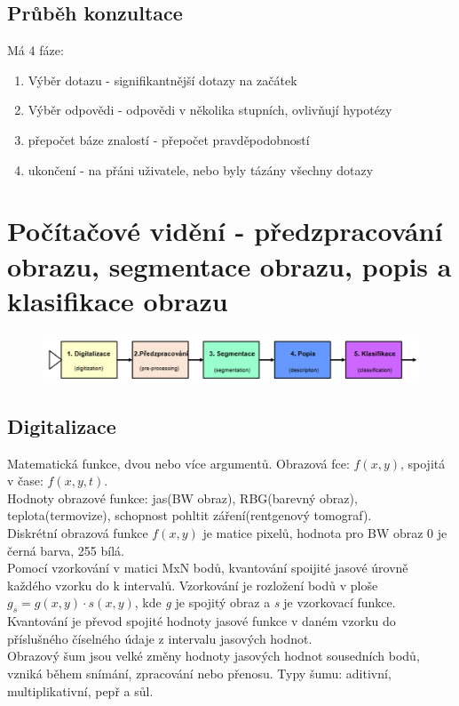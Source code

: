 \subsection{Průběh konzultace}
Má 4 fáze:
\begin{enumerate}
    \item Výběr dotazu - signifikantnější dotazy na začátek
    \item Výběr odpovědi - odpovědi v několika stupních, ovlivňují hypotézy
    \item přepočet báze znalostí - přepočet pravděpodobností
    \item ukončení - na přáni uživatele, nebo byly tázány všechny dotazy
\end{enumerate}

\section{Počítačové vidění - předzpracování obrazu, segmentace obrazu, popis a klasifikace obrazu}
\begin{figure}[H]
    \includegraphics[scale = 0.4]{images/pc_videni.png}
\end{figure}
\subsection{Digitalizace}
Matematická funkce, dvou nebo více argumentů. Obrazová fce: \(f(x,y)\), spojitá v čase: \(f(x,y,t)\).\\
Hodnoty obrazové funkce: jas(BW obraz), RBG(barevný obraz), teplota(termovize), schopnost pohltit záření(rentgenový tomograf).\\
Diskrétní obrazová funkce \(f(x,y)\) je matice pixelů, hodnota pro BW obraz 0 je černá barva, 255 bílá.\\
Pomocí vzorkování v matici MxN bodů, kvantování spoijité jasové úrovně každého vzorku do k intervalů. Vzorkování je rozložení bodů v ploše \(g_s = g(x,y)\cdot s(x,y)\), kde \textit{g} je spojitý obraz a \textit{s} je vzorkovací funkce. Kvantování je převod spojité hodnoty jasové funkce v daném vzorku do příslušného číselného údaje z intervalu jasových hodnot.\\
Obrazový šum jsou velké změny hodnoty jasových hodnot sousedních bodů, vzniká během snímání, zpracování nebo přenosu. Typy šumu: aditivní, multiplikativní, pepř a sůl.\\

